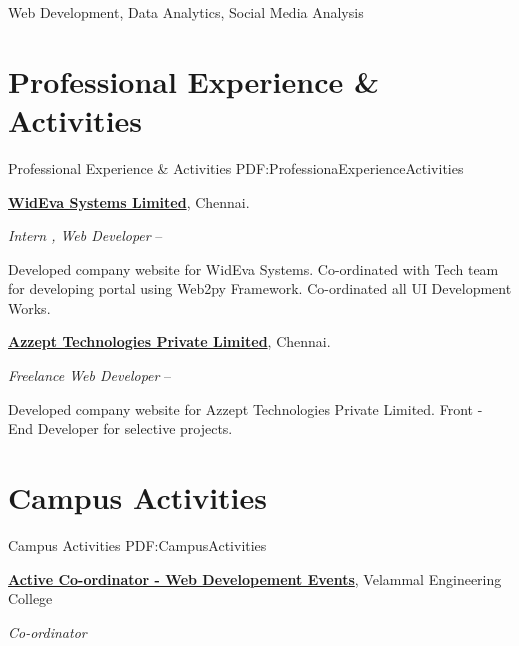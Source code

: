 \documentclass[letterpaper,MMMyyyy,nonstop]{simpleresumecv}
\begin{document}
\begin{body}
Web Development,
Data Analytics,
Social Media Analysis



\section
{Professional Experience\newline
\& Activities}
{Professional Experience \& Activities}
{PDF:ProfessionaExperienceActivities}

\href{http://www.wideva.com}
{\textbf{WidEva Systems Limited}},
Chennai.

\GapNoBreak
\BulletItem
\emph{Intern , Web Developer}
\hfill
{} -- 

\begin{detail}
\SubBulletItem
Developed company website for WidEva Systems.
\SubBulletItem
Co-ordinated with Tech team for developing portal  using Web2py Framework.
\SubBulletItem
Co-ordinated all UI Development Works.
\end{detail}

\BigGap
\href{http://www.azzept.com}
{\textbf{Azzept Technologies Private Limited}},
Chennai.

\newline

\GapNoBreak
\BulletItem
\emph {Freelance Web Developer}
\hfill
{} -- 

\begin{detail}
\SubBulletItem
Developed company website for Azzept Technologies Private Limited.
\SubBulletItem
Front - End Developer for selective projects.
\end{detail}

\BigGap


\section
{Campus Activities}
{Campus Activities}
{PDF:CampusActivities}

\href{\#}
{\textbf{Active Co-ordinator - Web Developement Events}},
Velammal Engineering College

\GapNoBreak
\BulletItem
\emph{ Co-ordinator}
\hfill
{}


\end{body}
\end{document}
